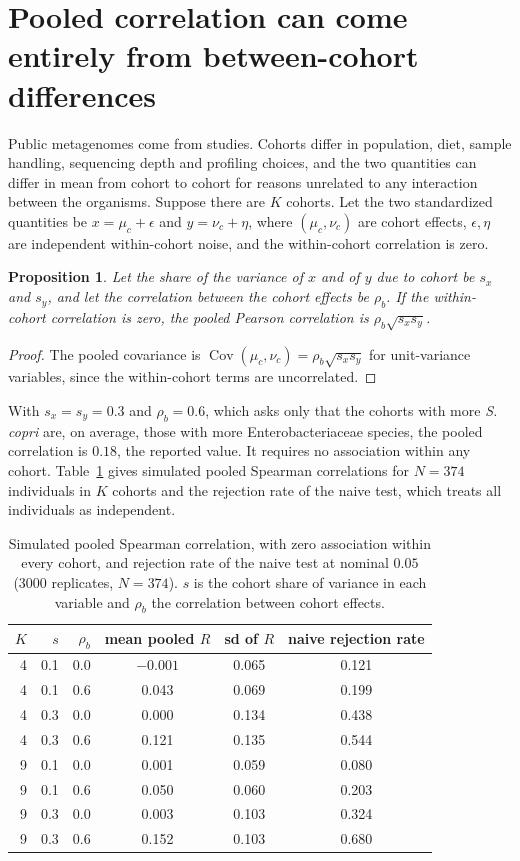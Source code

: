 \documentclass[11pt]{article}
\newtheorem{proposition}{Proposition}
\theoremstyle{definition}
\newcommand{\Cov}{\operatorname{Cov}}
\begin{document}
\section{Pooled correlation can come entirely from between-cohort differences}

Public metagenomes come from studies. Cohorts differ in population, diet, sample handling, sequencing depth and profiling choices, and the two quantities can differ in mean from cohort to cohort for reasons unrelated to any interaction between the organisms. Suppose there are $K$ cohorts. Let the two standardized quantities be $x=\mu_c+\epsilon$ and $y=\nu_c+\eta$, where $(\mu_c,\nu_c)$ are cohort effects, $\epsilon,\eta$ are independent within-cohort noise, and the within-cohort correlation is zero.

\begin{proposition}
Let the share of the variance of $x$ and of $y$ due to cohort be $s_x$ and $s_y$, and let the correlation between the cohort effects be $\rho_b$. If the within-cohort correlation is zero, the pooled Pearson correlation is $\rho_b\sqrt{s_xs_y}$.
\end{proposition}

\begin{proof}
The pooled covariance is $\Cov(\mu_c,\nu_c)=\rho_b\sqrt{s_xs_y}$ for unit-variance variables, since the within-cohort terms are uncorrelated.
\end{proof}

With $s_x=s_y=0.3$ and $\rho_b=0.6$, which asks only that the cohorts with more \emph{S. copri} are, on average, those with more Enterobacteriaceae species, the pooled correlation is $0.18$, the reported value. It requires no association within any cohort. Table~\ref{tab:pooled} gives simulated pooled Spearman correlations for $N=374$ individuals in $K$ cohorts and the rejection rate of the naive test, which treats all individuals as independent.

\begin{table}[h]
\centering
\caption{Simulated pooled Spearman correlation, with zero association within every cohort, and rejection rate of the naive test at nominal $0.05$ (3000 replicates, $N=374$). $s$ is the cohort share of variance in each variable and $\rho_b$ the correlation between cohort effects.}
\label{tab:pooled}
\small
\begin{tabular}{rrrccc}
\toprule
$K$ & $s$ & $\rho_b$ & mean pooled $R$ & sd of $R$ & naive rejection rate \\
\midrule
4 & 0.1 & 0.0 & $-0.001$ & 0.065 & 0.121 \\
4 & 0.1 & 0.6 & 0.043 & 0.069 & 0.199 \\
4 & 0.3 & 0.0 & $0.000$ & 0.134 & 0.438 \\
4 & 0.3 & 0.6 & 0.121 & 0.135 & 0.544 \\
9 & 0.1 & 0.0 & 0.001 & 0.059 & 0.080 \\
9 & 0.1 & 0.6 & 0.050 & 0.060 & 0.203 \\
9 & 0.3 & 0.0 & 0.003 & 0.103 & 0.324 \\
9 & 0.3 & 0.6 & 0.152 & 0.103 & 0.680 \\
\bottomrule
\end{tabular}
\end{table}
\end{document}
